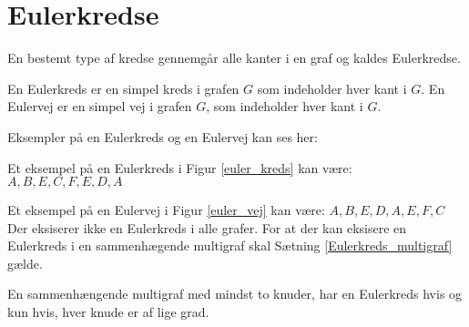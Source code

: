 \section{Eulerkredse}

En bestemt type af kredse gennemgår alle kanter i en graf og kaldes Eulerkredse. 

\begin{defn}\label{euler_def}
En Eulerkreds er en simpel kreds i grafen $G$ som indeholder hver kant i $G$.
En Eulervej er en simpel vej i grafen $G$, som indeholder hver kant i $G$.  
\end{defn}
\begin{exmp}
Eksempler på en Eulerkreds og en Eulervej kan ses her: 
\end{exmp}



\noindent Et eksempel på en Eulerkreds i Figur \ref{euler_kreds} kan være: $A,B,E,C,F,E,D,A$




\noindent Et eksempel på en Eulervej i Figur \ref{euler_vej} kan være: $A,B,E,D,A,E,F,C$\\

\noindent Der eksiserer ikke en Eulerkreds i alle grafer.
For at der kan eksisere en Eulerkreds i en sammenhægende multigraf skal Sætning \ref{Eulerkreds_multigraf} gælde. 

\begin{thm}\label{Eulerkreds_multigraf}
En sammenhængende multigraf med mindst to knuder, har en Eulerkreds hvis og kun hvis, hver knude er af lige grad.
\end{thm}

